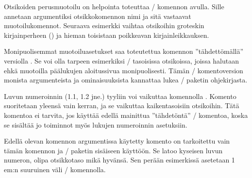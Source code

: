 Otsikoiden perusmuotoilu on helpointa toteuttaa
\-/ komennon avulla. Sille annetaan argumentiksi
otsikkokomennon nimi ja sitä vastaavat muotoilukomennot. Seuraava
esimerkki vaihtaa otsikoihin groteskin kirjainperheen
() ja hieman toisistaan poikkeavan kirjainleikkauksen.

\begin{koodilohkosis}
  \titleformat*{\section}      {\sffamily\bfseries\Large}
  \titleformat*{\subsection}   {\sffamily\bfseries\itshape\large}
  \titleformat*{\subsubsection}{\sffamily\bfseries\normalsize}
\end{koodilohkosis}

Monipuolisemmat muotoiluasetukset saa toteutettua komennon
''tähdettömällä'' versiolla . Se voi olla tarpeen
esimerkiksi \-/ tasoisissa otsikoissa, joissa halutaan
ehkä muotoilla päälukujen aloitussivua monipuolisesti. Tämän
\-/ komentoversion monista argumenteista ja
ominaisuuksista kannattaa lukea \-/ paketin
ohjekirjasta.

Luvun numeroinnin (1.1, 1.2 jne.) tyyliin voi vaikuttaa komennolla
. Komento suoritetaan yleensä vain kerran, ja se
vaikuttaa kaikentasoisiin otsikoihin. Tätä komentoa ei tarvita, jos
käyttää edellä mainittua ''tähdetöntä'' \-/
komentoa, koska se sisältää jo toiminnot myös lukujen numeroinnin
asetuksiin.

\begin{koodilohkosis}
  \titlelabel{\thetitle\hspace{1em}}
\end{koodilohkosis}

Edellä olevan komennon argumentissa käytetty komento 
on tarkoitettu vain tämän komennon ja \-/ paketin
sisäiseen käyttöön. Se latoo kyseisen luvun numeron, olipa otsikkotaso
mikä hyvänsä. Sen perään esimerkissä asetetaan 1\,em:n suuruinen väli
\-/ komennolla.

